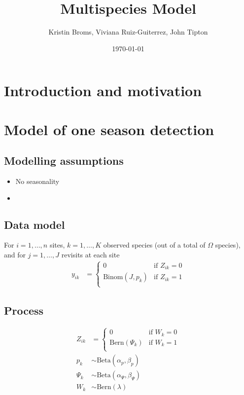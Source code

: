 \documentclass[fleqn]{article}
\title{Multispecies Model}
\author{Kristin Broms, Viviana Ruiz-Guiterrez, John Tipton}
\date{\today}
\begin{document}
%
\maketitle
%
\section{Introduction and motivation}
%
\section{Model of one season detection}
%
\subsection{Modelling assumptions}
%
\begin{itemize}
  \item No seasonality
  \item 
\end{itemize}
%
\subsection{Data model}
%
For $i = 1, \ldots, n$ sites,  $k = 1, \ldots, K$ observed species (out of a total of $\Omega$ species), and for $j = 1, \ldots, J$ revisits at each site
%
\begin{align*}
  y_{ik} & = 
    \begin{cases}
      0 & \mbox{if } Z_{ik} = 0\\
      \mbox{Binom}(J, p_k) & \mbox{if } Z_{ik} = 1\\
    \end{cases}
\end{align*}
%
\subsection{Process}
%
\begin{align*}
  Z_{ik} & = 
  \begin{cases}
    0 & \mbox{if } W_k = 0\\
    \mbox{Bern}(\Psi_k) & \mbox{if } W_k = 1\\
  \end{cases}\\
  p_k & \sim \mbox{Beta}(\alpha_p, \beta_p)\\
  \Psi_k & \sim \mbox{Beta}(\alpha_\Psi, \beta_\Psi)\\
  W_k & \sim \mbox{Bern}(\lambda)\\
\end{align*}
%
\end{document}
